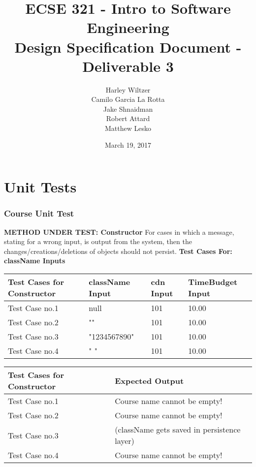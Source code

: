 \documentclass[12pt]{report}
\title{ECSE 321 - Intro to Software Engineering\\Design Specification Document - Deliverable 3}
\author{Harley Wiltzer\\Camilo Garcia La Rotta\\Jake Shnaidman\\Robert Attard\\Matthew Lesko}
\date{March 19, 2017}
\begin{document}
\maketitle
\newpage
{} %
\tableofcontents
\part{Unit Tests}
\section{Course Unit Test}
	\textbf{METHOD UNDER TEST: Constructor} \newline
	 For cases in which a message, stating for a wrong input, is output from the system, then the changes/creations/deletions of objects should not persist.\newline
	\textbf{Test Cases For: className Inputs}
	\begin{flushleft}
		\begin{tabular}{ | l | l | l | l | }
			\hline
			Test Cases for Constructor & className Input & cdn Input & TimeBudget Input \\ \hline
			Test Case no.1 & null & 101 & 10.00 \\ \hline
			Test Case no.2 & "" & 101 & 10.00  \\ \hline
			Test Case no.3 & "1234567890" & 101 & 10.00  \\ \hline
			Test Case no.4 & " " & 101 & 10.00 \\ \hline
		\end{tabular}
	\end{flushleft}

	\begin{flushleft}
		\begin{tabular}{ | l | l | }
			\hline
			Test Cases for Constructor & Expected Output \\ \hline
			Test Case no.1 & Course name cannot be empty! \\ \hline
			Test Case no.2 & Course name cannot be empty! \\ \hline
			Test Case no.3 &  (className gets saved in persistence layer) \\ \hline
			Test Case no.4 & Course name cannot be empty! \\ \hline
			
		\end{tabular}
	\end{flushleft}
\end{document}
